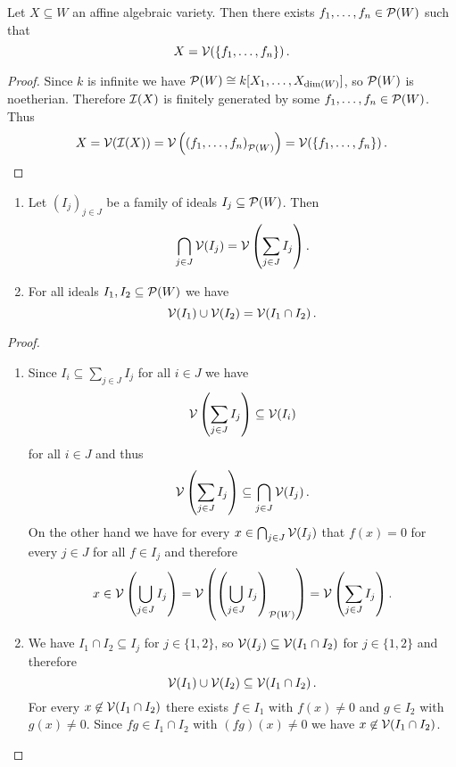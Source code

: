 \begin{cor}
  Let $X \subseteq W$ an affine algebraic variety.
  Then there exists $f_1, \dotsc, f_n \in \mathcal{P}(W)$ such that
  \[
      X
    = \mathcal{V}( \{f_1, \dotsc, f_n\} ) \,.
  \]
\end{cor}
\begin{proof}
  Since $k$ is infinite we have $\mathcal{P}(W) \cong k[X_1, \dotsc, X_{\dim(W)}]$, so $\mathcal{P}(W)$ is noetherian.
  Therefore $\mathcal{I}(X)$ is finitely generated by some $f_1, \dotsc, f_n \in \mathcal{P}(W)$.
  Thus
  \[
      X
    = \mathcal{V}( \mathcal{I}(X) )
    = \mathcal{V}\left( \left( f_1, \dotsc, f_n \right)_{\mathcal{P}(W)} \right)
    = \mathcal{V}( \{f_1, \dotsc, f_n\} ) \,.
    \qedhere
  \]
\end{proof}


\begin{prop}
  \begin{enumerate}[label=\emph{\alph*)},leftmargin=*]
    \item
      Let $(I_j)_{j \in J}$ be a family of ideals $I_j \subseteq \mathcal{P}(W)$. Then
      \[
          \bigcap_{j \in J} \mathcal{V}(I_j)
        = \mathcal{V}\left( \sum_{j \in J} I_j \right).
      \]
    \item
      For all ideals $I_1, I_2 \subseteq \mathcal{P}(W)$ we have
      \[
          \mathcal{V}(I_1) \cup \mathcal{V}(I_2)
        = \mathcal{V}(I_1 \cap I_2) \,.
      \]
  \end{enumerate}
\end{prop}
\begin{proof}
  \begin{enumerate}[label=\emph{\alph*)},leftmargin=*]
    \item
      Since $I_i \subseteq \sum_{j \in J} I_j$ for all $i \in J$ we have
      \[
                  \mathcal{V}\left( \sum_{j \in J} I_j \right)
        \subseteq \mathcal{V}(I_i)
      \]
      for all $i \in J$ and thus
      \[
                  \mathcal{V}\left( \sum_{j \in J} I_j \right)
        \subseteq \bigcap_{j \in J} \mathcal{V}(I_j) \,.
      \]
      On the other hand we have for every $x \in \bigcap_{j \in J} \mathcal{V}(I_j)$ that $f(x) = 0$ for every $j \in J$ for all $f \in I_j$ and therefore
      \[
            x
        \in \mathcal{V}\left( \bigcup_{j \in J} I_j \right)
        =   \mathcal{V}\left( \left( \bigcup_{j \in J} I_j \right)_{\mathcal{P}(W)} \right)
        =   \mathcal{V}\left( \sum_{j \in J} I_j \right).
      \]
    \item
      We have $I_1 \cap I_2 \subseteq I_j$ for $j \in \{1,2\}$, so $\mathcal{V}(I_j) \subseteq \mathcal{V}(I_1 \cap I_2)$ for $j \in \{1,2\}$ and therefore
      \[
                  \mathcal{V}(I_1) \cup \mathcal{V}(I_2)
        \subseteq \mathcal{V}(I_1 \cap I_2) \,.
      \]
      For every $x \not\in \mathcal{V}(I_1 \cap I_2)$ there exists $f \in I_1$ with $f(x) \neq 0$ and $g \in I_2$ with $g(x) \neq 0$.
      Since $fg \in I_1 \cap I_2$ with $(fg)(x) \neq 0$ we have $x \not\in \mathcal{V}(I_1 \cap I_2)$.
    \qedhere
  \end{enumerate}
\end{proof}


